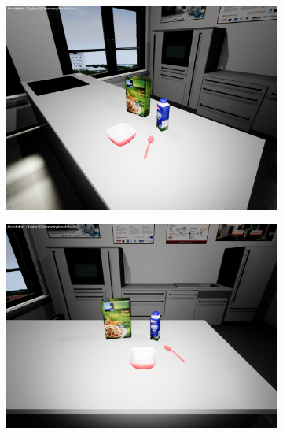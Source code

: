 \begin{figure}
\centering
	\begin{subfigure}[b]{0.3\textwidth}
		\includegraphics[scale=.1]{img/chapter3/sceneEx_1}
	\end{subfigure}
	\quad
	\begin{subfigure}[b]{0.3\textwidth}
		\includegraphics[scale=.1]{img/chapter3/sceneEx_2}	
	\end{subfigure}
	\quad
	\begin{subfigure}[b]{0.3\textwidth}

\end{subfigure}
\end{figure}
